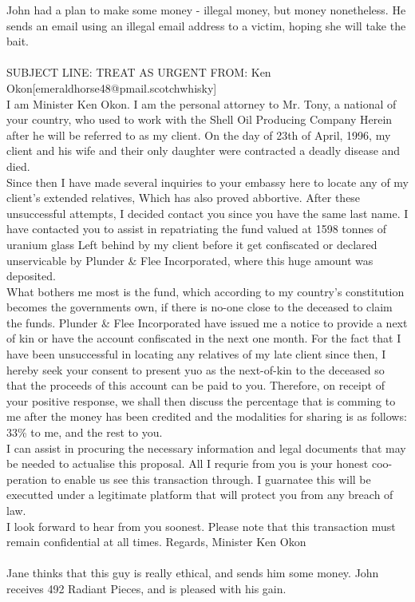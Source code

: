 \documentclass{article}
\begin{document}
John had a plan to make some money {-} illegal money, but money nonetheless.
He sends an email using an illegal email address to a victim, hoping she will take the bait.
\\\\
SUBJECT LINE: TREAT AS URGENT
FROM: Ken Okon[emeraldhorse48@pmail.scotchwhisky]
\\
I am Minister Ken Okon.
I am the personal attorney to Mr. Tony, a national of your country, who used to work with the Shell Oil Producing Company
Herein after he will be referred to as my client.
On the day of 23th of April, 1996, my client and his wife and their only daughter were contracted a deadly disease and died.
\\
Since then I have made several inquiries to your embassy here to locate any of my client's extended relatives, Which has also proved abbortive.
After these unsuccessful attempts, I decided contact you since you have the same last name.
I have contacted you to assist in repatriating the fund valued at 1598 tonnes of uranium glass Left behind by my client before it get confiscated or declared unservicable by Plunder \& Flee Incorporated, where this huge amount was deposited.
\\
What bothers me most is the fund, which according to my country's constitution becomes the governments own, if there is no{-}one close to the deceased to claim the funds.
Plunder \& Flee Incorporated have issued me a notice to provide a next of kin or have the account confiscated in the next one month.
For the fact that I have been unsuccessful in locating any relatives of my late client since then, I hereby seek your consent to present yuo as the next{-}of{-}kin to the deceased so that the proceeds of this account can be paid to you.
Therefore, on receipt of your positive response, we shall then discuss the percentage that is comming to me after the money has been credited and the modalities for sharing is as follows: 33\% to me, and the rest to you.
\\
I can assist in procuring the necessary information and legal documents that may be needed to actualise this proposal.
All I requrie from you is your honest coo{-}peration to enable us see this transaction through.
I guarnatee this will be executted under a legitimate platform that will protect you from any breach of law.
\\
I look forward to hear from you soonest.
Please note that this transaction must remain confidential at all times.
Regards, Minister Ken Okon
\\\\
Jane thinks that this guy is really ethical, and sends him some money.
John receives 492 Radiant Pieces, and is pleased with his gain.
\end{document}
